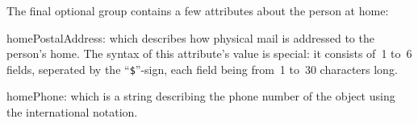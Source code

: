 The final optional group contains a few attributes about the person at home:
\begin{describe}
\item[homePostalAddress:]
			which describes how physical mail is addressed to the
			person's home.
			The syntax of this attribute's value is special:
			it consists of~1 to~6 fields, seperated by the
			``\verb"$"''-sign, each field being from~1 to~30
			characters long.

\item[homePhone:]
		which is a string describing the phone number of the object
		using the international notation.
\end{describe}
